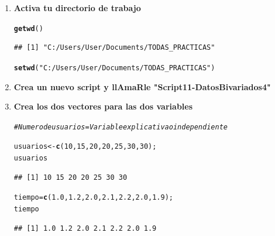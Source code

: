 \documentclass[12pt,letterpaper]{article}\usepackage[]{graphicx}\usepackage[]{color}
\makeatletter
\newcommand{\hlnum}[1]{\textcolor[rgb]{0.686,0.059,0.569}{#1}}%
\newcommand{\hlstr}[1]{\textcolor[rgb]{0.192,0.494,0.8}{#1}}%
\newcommand{\hlcom}[1]{\textcolor[rgb]{0.678,0.584,0.686}{\textit{#1}}}%
\newcommand{\hlstd}[1]{\textcolor[rgb]{0.345,0.345,0.345}{#1}}%
\newcommand{\hlkwb}[1]{\textcolor[rgb]{0.69,0.353,0.396}{#1}}%
\newcommand{\hlkwd}[1]{\textcolor[rgb]{0.737,0.353,0.396}{\textbf{#1}}}%
\newenvironment{kframe}{%
 \def\at@end@of@kframe{}%
 \ifinner\ifhmode%
  \def\at@end@of@kframe{\end{minipage}}%
  \begin{minipage}{\columnwidth}%
 \fi\fi%
 \def\FrameCommand##1{\hskip\@totalleftmargin \hskip-\fboxsep
 \colorbox{shadecolor}{##1}\hskip-\fboxsep
     \hskip-\linewidth \hskip-\@totalleftmargin \hskip\columnwidth}%
 \MakeFramed {\advance\hsize-\width
   \@totalleftmargin\z@ \linewidth\hsize
   \@setminipage}}%
 {\par\unskip\endMakeFramed%
 \at@end@of@kframe}
\newenvironment{knitrout}{}{} %
\makeatother
\begin{document}
\begin{enumerate}
\item\textbf{Activa tu directorio de trabajo}   

\begin{knitrout}
\color{fgcolor}\begin{kframe}
\begin{alltt}
\hlkwd{getwd}\hlstd{()}
\end{alltt}
\begin{verbatim}
## [1] "C:/Users/User/Documents/TODAS_PRACTICAS"
\end{verbatim}
\begin{alltt}
\hlkwd{setwd}\hlstd{(}\hlstr{"C:/Users/User/Documents/TODAS_PRACTICAS"}\hlstd{)}
\end{alltt}
\end{kframe}
\end{knitrout}

\item\textbf{Crea un nuevo script y llAmaRle "Script11-DatosBivariados4"} 

\item\textbf{Crea los dos vectores para las dos variables} 

\begin{knitrout}
\color{fgcolor}\begin{kframe}
\begin{alltt}
\hlcom{# Numero de usuarios = Variable explicativa o independiente}

\hlstd{usuarios} \hlkwb{<-} \hlkwd{c}\hlstd{(}\hlnum{10}\hlstd{,} \hlnum{15}\hlstd{,} \hlnum{20}\hlstd{,} \hlnum{20}\hlstd{,} \hlnum{25}\hlstd{,} \hlnum{30}\hlstd{,} \hlnum{30}\hlstd{);}
\hlstd{usuarios}
\end{alltt}
\begin{verbatim}
## [1] 10 15 20 20 25 30 30
\end{verbatim}
\begin{alltt}
\hlstd{tiempo} \hlkwb{=} \hlkwd{c}\hlstd{(}\hlnum{1.0}\hlstd{,} \hlnum{1.2}\hlstd{,} \hlnum{2.0}\hlstd{,} \hlnum{2.1}\hlstd{,} \hlnum{2.2}\hlstd{,} \hlnum{2.0}\hlstd{,} \hlnum{1.9}\hlstd{);}
\hlstd{tiempo}
\end{alltt}
\begin{verbatim}
## [1] 1.0 1.2 2.0 2.1 2.2 2.0 1.9
\end{verbatim}
\end{kframe}
\end{knitrout}


\end{enumerate}
\end{document}
